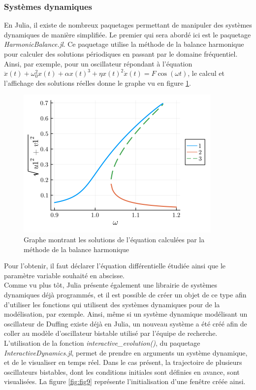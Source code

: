 \documentclass[a4paper, french, 12pt, titlepage]{article}
\begin{document}
\subsubsection{Systèmes dynamiques}

En Julia, il existe de nombreux paquetages permettant de manipuler des systèmes dynamiques de manière simplifiée. Le premier qui sera abordé ici est le paquetage \emph{HarmonicBalance.jl}. Ce paquetage utilise la méthode de la balance harmonique pour calculer des solutions périodiques en passant par le domaine fréquentiel. Ainsi, par exemple, pour un oscillateur répondant à l'équation $\ddot x(t) + \omega_0^2 x(t) + \alpha x(t)^3 + \eta x(t)^2 \dot x (t) = F \cos(\omega t)$, le calcul et l'affichage des solutions réelles donne le graphe vu en figure \ref{fig:fig8}.\\

\begin{figure}[H]
\begin{center}
  \includegraphics[width=0.45\linewidth]{harmonicbalance.png}
  \caption{Graphe montrant les solutions de l'équation calculées par la méthode de la balance harmonique}
  \label{fig:fig8}
\end{center}
\end{figure}

Pour l'obtenir, il faut déclarer l'équation différentielle étudiée ainsi que le paramètre variable souhaité en abscisse.\\

Comme vu plus tôt, Julia présente également une librairie de systèmes dynamiques déjà programmés, et il est possible de créer un objet de ce type afin d'utiliser les fonctions qui utilisent des systèmes dynamiques pour de la modélisation, par exemple. Ainsi, même si un système dynamique modélisant un oscillateur de Duffing existe déjà en Julia, un nouveau système a été créé afin de coller au modèle d'oscillateur bistable utilisé par l'équipe de recherche. \\

L'utilisation de la fonction \emph{interactive\_evolution()}, du paquetage \emph{InteractiveDynamics.jl}, permet de prendre en arguments un système dynamique, et de le visualiser en temps réel. Dans le cas présent, la trajectoire de plusieurs oscillateurs bistables, dont les conditions initiales sont définies en avance, sont visualisées. La figure \ref{fig:fig9} représente l'initialisation d'une fenêtre créée ainsi. \\
\end{document}
